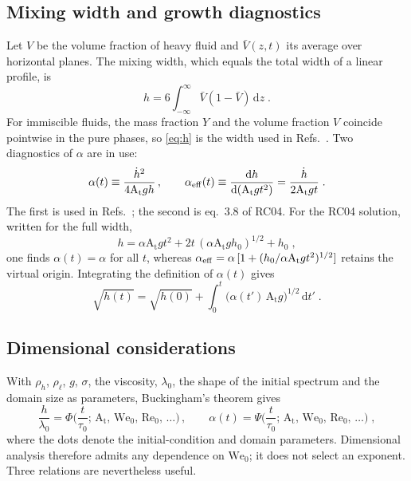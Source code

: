 \documentclass[11pt]{article}
\numberwithin{equation}{section}
\newcommand{\At}{\mathrm{A_t}}
\newcommand{\We}{\mathrm{We}_0}
\newcommand{\hd}{\dot h}
\begin{document}
\subsection{Mixing width and growth diagnostics}\label{sec:setup:diag}
Let $V$ be the volume fraction of heavy fluid and $\bar V(z, t)$ its average over horizontal planes. The mixing width, which equals the total width of a linear profile, is
\begin{equation}\label{eq:h}
h = 6 \int_{-\infty}^{\infty} \bar V(1 - \bar V) \, \mathrm d z \;.
\end{equation}
For immiscible fluids, the mass fraction $Y$ and the volume fraction $V$ coincide pointwise in the pure phases, so \eqref{eq:h} is the width used in Refs.~\cite{Walker2026,Walker2027_1}. Two diagnostics of $\alpha$ are in use:
\begin{equation}\label{eq:alpha_defs}
\alpha(t) \equiv \frac{\hd^2}{4 \At g h} \, , \qquad
\alpha_{\rm eff}(t) \equiv \frac{\mathrm d h}{\mathrm d(\At g t^2)} = \frac{\hd}{2 \At g t} \;.
\end{equation}
The first is used in Refs.~\cite{Walker2026,Walker2027_1}; the second is eq.~3.8 of RC04. For the RC04 solution, written for the full width,
\begin{equation}\label{eq:rc_solution}
h = \alpha \At g t^2 + 2 t \,(\alpha \At g h_0)^{1/2} + h_0 \;,
\end{equation}
one finds $\alpha(t) = \alpha$ for all $t$, whereas $\alpha_{\rm eff} = \alpha \,[1 + (h_0/\alpha \At g t^2)^{1/2}]$ retains the virtual origin. Integrating the definition of $\alpha(t)$ gives
\begin{equation}\label{eq:sqrt_h}
\sqrt{h(t)} = \sqrt{h(0)} + \int_0^t \big(\alpha(t') \, \At g\big)^{1/2} \, \mathrm d t' \;.
\end{equation}

\subsection{Dimensional considerations}\label{sec:setup:dim}
With $\rho_h$, $\rho_\ell$, $g$, $\sigma$, the viscosity, $\lambda_0$, the shape of the initial spectrum and the domain size as parameters, Buckingham's theorem gives
\begin{equation}\label{eq:pi}
\frac{h}{\lambda_0} = \Phi \Big(\frac{t}{\tau_0}; \, \At, \, \We, \, \mathrm{Re}_0, \, \dots\Big) \, , \qquad
\alpha(t) = \Psi \Big(\frac{t}{\tau_0}; \, \At, \, \We, \, \mathrm{Re}_0, \, \dots\Big) \;,
\end{equation}
where the dots denote the initial-condition and domain parameters. Dimensional analysis therefore admits any dependence on $\We$; it does not select an exponent. Three relations are nevertheless useful.
\end{document}
